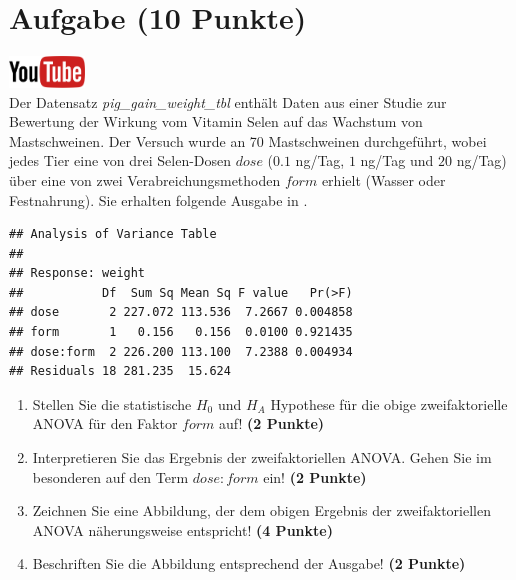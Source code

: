 \documentclass[a4paper, 9pt]{scrartcl}\usepackage[]{graphicx}\usepackage[]{xcolor}
\makeatletter
\newenvironment{kframe}{%
 \def\at@end@of@kframe{}%
 \ifinner\ifhmode%
  \def\at@end@of@kframe{\end{minipage}}%
  \begin{minipage}{\columnwidth}%
 \fi\fi%
 \def\FrameCommand##1{\hskip\@totalleftmargin \hskip-\fboxsep
 \colorbox{shadecolor}{##1}\hskip-\fboxsep
     \hskip-\linewidth \hskip-\@totalleftmargin \hskip\columnwidth}%
 \MakeFramed {\advance\hsize-\width
   \@totalleftmargin\z@ \linewidth\hsize
   \@setminipage}}%
 {\par\unskip\endMakeFramed%
 \at@end@of@kframe}
\newenvironment{knitrout}{}{} %
\makeatother
\begin{document}
\clearpage

\section{Aufgabe \hfill (10 Punkte)}

\hfill\href{https://youtu.be/rWTyHXXlYjY}{\includegraphics[width =
  2cm]{img/youtube}}\\[1Ex]



Der Datensatz \textit{pig\_gain\_weight\_tbl} enth{\"a}lt Daten aus einer Studie zur Bewertung
der Wirkung vom Vitamin Selen auf das Wachstum von Mastschweinen. Der
Versuch wurde an 70 Mastschweinen durchgef{\"u}hrt, wobei
jedes Tier eine von drei Selen-Dosen $dose$ ($0.1$ ng/Tag, $1$ ng/Tag und $20$ ng/Tag)
{\"u}ber eine von zwei Verabreichungsmethoden $form$ erhielt (Wasser oder
Festnahrung). Sie erhalten folgende Ausgabe in \Rlogo.

\begin{knitrout}
\color{fgcolor}\begin{kframe}
\begin{verbatim}
## Analysis of Variance Table
## 
## Response: weight
##           Df  Sum Sq Mean Sq F value   Pr(>F)
## dose       2 227.072 113.536  7.2667 0.004858
## form       1   0.156   0.156  0.0100 0.921435
## dose:form  2 226.200 113.100  7.2388 0.004934
## Residuals 18 281.235  15.624
\end{verbatim}
\end{kframe}
\end{knitrout}

\begin{enumerate}
\item Stellen Sie die statistische $H_0$ und $H_A$ Hypothese f{\"u}r die obige
  zweifaktorielle ANOVA f{\"u}r den Faktor $form$
  auf! \textbf{(2 Punkte)}
\item Interpretieren Sie das Ergebnis der zweifaktoriellen ANOVA. Gehen Sie
  im besonderen auf den Term $dose:form$ ein! \textbf{(2 Punkte)}
\item Zeichnen Sie eine Abbildung, der dem obigen Ergebnis der
  zweifaktoriellen ANOVA n{\"a}herungsweise entspricht! \textbf{(4 Punkte)}
\item Beschriften Sie die Abbildung entsprechend der \Rlogo Ausgabe! \textbf{(2 Punkte)}
\end{enumerate}
 
\end{document}
